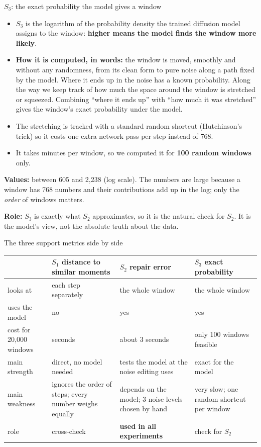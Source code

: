 \documentclass[aspectratio=169,10pt]{beamer}
\begin{document}
\begin{frame}{$S_3$: the exact probability the model gives a window}
\begin{itemize}
\item $S_3$ is the logarithm of the probability density the trained diffusion model assigns to the window: \textbf{higher means the model finds the window more likely}.
\item \textbf{How it is computed, in words:} the window is moved, smoothly and without any randomness, from its clean form to pure noise along a path fixed by the model. Where it ends up in the noise has a known probability. Along the way we keep track of how much the space around the window is stretched or squeezed. Combining ``where it ends up'' with ``how much it was stretched'' gives the window's exact probability under the model.
\item The stretching is tracked with a standard random shortcut (Hutchinson's trick) so it costs one extra network pass per step instead of 768.
\item It takes minutes per window, so we computed it for \textbf{100 random windows} only.
\end{itemize}
\vspace{0.4em}
\textbf{Values:} between 605 and 2{,}238 (log scale). The numbers are large because a window has 768 numbers and their contributions add up in the log; only the \emph{order} of windows matters.
\vspace{0.4em}

\textbf{Role:} $S_3$ is exactly what $S_2$ approximates, so it is the natural check for $S_2$. It is the model's view, not the absolute truth about the data.
\end{frame}

\begin{frame}[shrink=4]{The three support metrics side by side}
\renewcommand{\arraystretch}{1.35}
\begin{tabularx}{\linewidth}{@{}lYYY@{}}
\toprule
 & $S_1$ distance to similar moments & $S_2$ repair error & $S_3$ exact probability\\
\midrule
looks at & each step separately & the whole window & the whole window\\
uses the model & no & yes & yes\\
cost for 20{,}000 windows & seconds & about 3 seconds & only 100 windows feasible\\
main strength & direct, no model needed & tests the model at the noise editing uses & exact for the model\\
main weakness & ignores the order of steps; every number weighs equally & depends on the model; 3 noise levels chosen by hand & very slow; one random shortcut per window\\
role & cross-check & \textbf{used in all experiments} & check for $S_2$\\
\bottomrule
\end{tabularx}
\end{frame}
\end{document}
